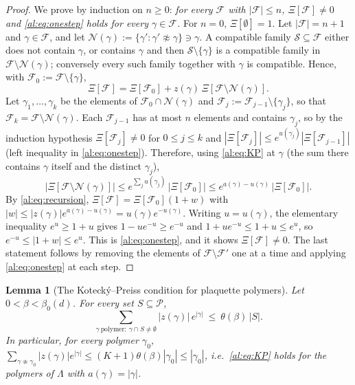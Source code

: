 \documentclass[11pt,a4paper]{article}
\newtheorem{lemma}[theorem]{Lemma}
\theoremstyle{definition}
\theoremstyle{remark}
\newcommand{\cP}{\mathcal{P}}
\newcommand{\cS}{\mathcal{S}}
\begin{document}
\begin{proof}
We prove by induction on $n\ge0$: \emph{for every $\mathcal F$ with $|\mathcal F|\le n$, $\Xi[\mathcal F]\neq0$ and
\eqref{al:eq:onestep} holds for every $\gamma\in\mathcal F$.} For $n=0$, $\Xi[\emptyset]=1$. Let $|\mathcal F|=n+1$ and
$\gamma\in\mathcal F$, and let $\mathcal N(\gamma):=\{\gamma':\gamma'\not\approx\gamma\}\ni\gamma$. A compatible family
$\cS\subseteq\mathcal F$ either does not contain $\gamma$, or contains $\gamma$ and then $\cS\setminus\{\gamma\}$ is a
compatible family in $\mathcal F\setminus\mathcal N(\gamma)$; conversely every such family together with $\gamma$ is
compatible. Hence, with $\mathcal F_0:=\mathcal F\setminus\{\gamma\}$,
\begin{equation}\label{al:eq:recursion}
\Xi[\mathcal F]=\Xi[\mathcal F_0]+z(\gamma)\,\Xi[\mathcal F\setminus\mathcal N(\gamma)] .
\end{equation}
Let $\gamma_1,\dots,\gamma_k$ be the elements of $\mathcal F_0\cap\mathcal N(\gamma)$ and
$\mathcal F_j:=\mathcal F_{j-1}\setminus\{\gamma_j\}$, so that $\mathcal F_k=\mathcal F\setminus\mathcal N(\gamma)$. Each
$\mathcal F_{j-1}$ has at most $n$ elements and contains $\gamma_j$, so by the induction hypothesis $\Xi[\mathcal F_j]\neq0$
for $0\le j\le k$ and $|\Xi[\mathcal F_j]|\le e^{u(\gamma_j)}|\Xi[\mathcal F_{j-1}]|$ (left inequality in
\eqref{al:eq:onestep}). Therefore, using \eqref{al:eq:KP} at $\gamma$ (the sum there contains $\gamma$ itself and the
distinct $\gamma_j$),
\[
\bigl|\Xi[\mathcal F\setminus\mathcal N(\gamma)]\bigr|\le e^{\sum_ju(\gamma_j)}\,|\Xi[\mathcal F_0]|\le e^{a(\gamma)-u(\gamma)}\,|\Xi[\mathcal F_0]| .
\]
By \eqref{al:eq:recursion}, $\Xi[\mathcal F]=\Xi[\mathcal F_0](1+w)$ with
$|w|\le|z(\gamma)|e^{a(\gamma)-u(\gamma)}=u(\gamma)e^{-u(\gamma)}$. Writing $u=u(\gamma)$, the elementary inequality
$e^u\ge1+u$ gives $1-ue^{-u}\ge e^{-u}$ and $1+ue^{-u}\le1+u\le e^u$, so $e^{-u}\le|1+w|\le e^u$. This is
\eqref{al:eq:onestep}, and it shows $\Xi[\mathcal F]\neq0$. The last statement follows by removing the elements of
$\mathcal F\setminus\mathcal F'$ one at a time and applying \eqref{al:eq:onestep} at each step.
\end{proof}

\begin{lemma}[The Kotecký--Preiss condition for plaquette polymers]\label{al:lem:KPsums}
Let $0<\beta<\beta_0(d)$. For every set $S\subseteq\cP$,
\[
\sum_{\gamma\ \text{polymer}:\ \gamma\cap S\neq\emptyset}|z(\gamma)|\,e^{|\gamma|}\ \le\ \theta(\beta)\,|S| .
\]
In particular, for every polymer $\gamma_0$, $\sum_{\gamma\not\approx\gamma_0}|z(\gamma)|e^{|\gamma|}\le(K+1)\theta(\beta)|\gamma_0|\le|\gamma_0|$,
i.e.\ \eqref{al:eq:KP} holds for the polymers of $\Lambda$ with $a(\gamma)=|\gamma|$.
\end{lemma}
\end{document}
